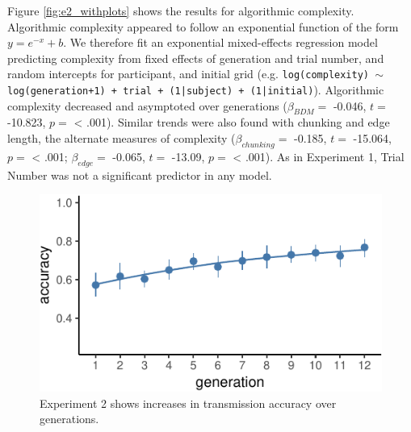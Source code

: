 \documentclass[10pt, letterpaper]{article}
\newenvironment{CodeChunk}{}{}
\begin{document}
Figure \ref{fig:e2_withplots} shows the results for algorithmic
complexity. Algorithmic complexity appeared to follow an exponential
function of the form \(y = e^{-x} + b\). We therefore fit an exponential
mixed-effects regression model predicting complexity from fixed effects
of generation and trial number, and random intercepts for participant,
and initial grid (e.g.
\texttt{log(complexity) $\sim$ log(generation+1) + trial + (1|subject) + (1|initial)}).
Algorithmic complexity decreased and asymptoted over generations
(\(\beta_{BDM} =\) -0.046, \(t =\) -10.823, \(p =\) \textless{} .001).
Similar trends were also found with chunking and edge length, the
alternate measures of complexity (\(\beta_{chunking} =\) -0.185, \(t =\)
-15.064, \(p =\) \textless{} .001; \(\beta_{edge} =\) -0.065, \(t =\)
-13.09, \(p =\) \textless{} .001). As in Experiment 1, Trial Number was
not a significant predictor in any model.

\begin{CodeChunk}
\begin{figure}[tb]

{\centering \includegraphics{figs/e2_acc_plot-1} 

}

\caption[Experiment 2 shows increases in transmission accuracy over generations]{Experiment 2 shows increases in transmission accuracy over generations.}\label{fig:e2_acc_plot}
\end{figure}
\end{CodeChunk}
\end{document}
